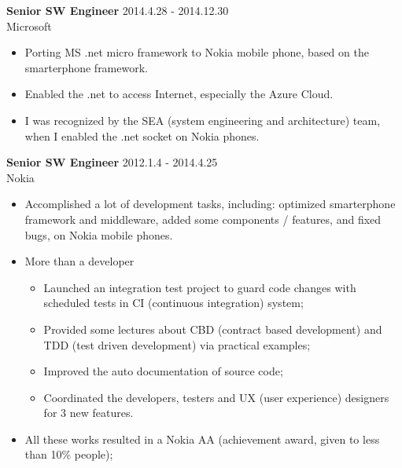 \textbf{Senior SW Engineer} \hfill 2014.4.28 - 2014.12.30\\
        Microsoft
        \begin{itemize}  \itemsep -2pt %
                \item Porting MS .net micro framework to Nokia mobile phone, based on the smarterphone framework.
                \item Enabled the .net to access Internet, especially the Azure Cloud.
                \item I was recognized by the SEA (system engineering and architecture) team, when I enabled the .net socket on Nokia phones.
        \end{itemize}

\textbf{Senior SW Engineer} \hfill 2012.1.4 - 2014.4.25\\
        Nokia
        \begin{itemize}  \itemsep -2pt %
        \item Accomplished a lot of development tasks, including:
            optimized smarterphone framework and middleware, added some components / features, and fixed bugs,
        on Nokia mobile phones.
        \item More than a developer 
            \begin{itemize}  \itemsep -2pt
                \item Launched an integration test project to guard code changes
                with scheduled tests in CI (continuous integration) system;
                \item Provided some lectures about CBD (contract based development) and
                TDD (test driven development) via practical examples;
                \item Improved the auto documentation of source code;
                \item Coordinated the developers, testers and UX (user experience) designers for 3 new features.
            \end{itemize}
        \item All these works resulted in a Nokia AA (achievement award, given to less than 10\% people);
        \end{itemize}

